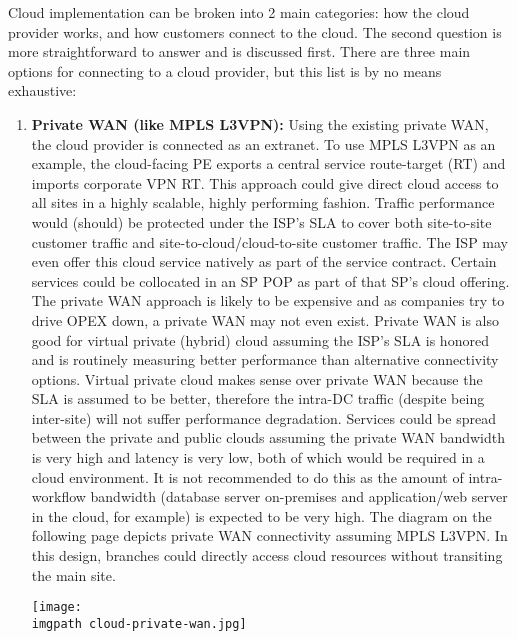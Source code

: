 Cloud implementation can be broken into 2 main categories: how the cloud
provider works, and how customers connect to the cloud. The second question is
more straightforward to answer and is discussed first. There are three main
options for connecting to a cloud provider, but this list is by no means
exhaustive:

\begin{enumerate}
  \item \textbf{Private WAN (like MPLS L3VPN):} Using the existing private WAN, the
  cloud provider is connected as an extranet. To use MPLS L3VPN as an example,
  the cloud-facing PE exports a central service route-target (RT) and imports
  corporate VPN RT. This approach could give direct cloud access to all sites
  in a highly scalable, highly performing fashion. Traffic performance would
  (should) be protected under the ISP’s SLA to cover both site-to-site
  customer traffic and site-to-cloud/cloud-to-site customer traffic. The ISP
  may even offer this cloud service natively as part of the service contract.
  Certain services could be collocated in an SP POP as part of that SP's cloud
  offering. The private WAN approach is likely to be expensive and as
  companies try to drive OPEX down, a private WAN may not even exist. Private
  WAN is also good for virtual private (hybrid) cloud assuming the ISP’s SLA
  is honored and is routinely measuring better performance than alternative
  connectivity options. Virtual private cloud makes sense over private WAN
  because the SLA is assumed to be better, therefore the intra-DC traffic
  (despite being inter-site) will not suffer performance degradation. Services
  could be spread between the private and public clouds assuming the private
  WAN bandwidth is very high and latency is very low, both of which would be
  required in a cloud environment. It is not recommended to do this as the
  amount of intra-workflow bandwidth (database server on-premises and
  application/web server in the cloud, for example) is expected to be very
  high. The diagram on the following page depicts private WAN connectivity
  assuming MPLS L3VPN. In this design, branches could directly access cloud
  resources without transiting the main site.

    \begin{minipage}[t]{\linewidth}
	  \centering
      \texttt{[image: \\imgpath cloud-private-wan.jpg]}
    \end{minipage}


\end{enumerate}
